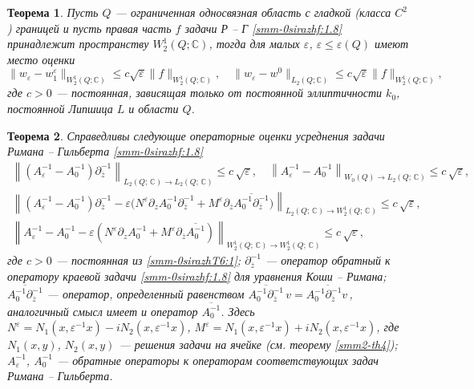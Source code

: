 \documentclass[a4paper,12pt]{article}
\newtheorem{theorem}{Теорема}[section]
\theoremstyle{definition}
\begin{document}
\begin{theorem}
{ Пусть $Q$ --- ограниченная односвязная область с гладкой (класса $C^2$) границей и пусть правая часть $f$ задачи Р -- Г \eqref{smm-0sirazhf:1.8} принадлежит пространству $W_2^1(Q;\mathbb{C})$, тогда для малых $\varepsilon$, $\varepsilon\leqslant \varepsilon(Q)$ имеют место оценки
	\begin{equation}\label{smm-0sirazhT6:1}
		\|w_\varepsilon-w_1^\varepsilon\|_{W_2^1 (Q; \mathbb{C})}\leqslant c\sqrt{\varepsilon}\|f
		\|_{W^1_2 (Q; \mathbb{C})}, \quad \|w_\varepsilon-w^0\|_{L_2 (Q; \mathbb{C})}\leqslant c\sqrt{\varepsilon}\|f
		\|_{W_2^1 (Q; \mathbb{C})},
	\end{equation}
	где $c>0$ --- постоянная, зависящая только от постоянной эллиптичности $k_0$,  постоянной Липшица $L$ и области $Q$.}
\end{theorem}




\begin{theorem}
{ Справедливы следующие операторные оценки усреднения задачи Римана -- Гильберта \eqref{smm-0sirazhf:1.8}
	\begin{gather}\label{smm-0sirazhOpop1}
		\left\|\left(A_\varepsilon^{-1}-A_0^{-1}\right)\partial_{\overline z}^{-1}\right\|_{L_2(Q;\,\mathbb{C})\to L_2(Q;\,\mathbb{C})}
		\leq c\,\sqrt\varepsilon,\quad
		\left\|A_\varepsilon^{-1}-A_0^{-1}\right\|_{W_0(Q)\to L_2(Q;\,\mathbb{C})}
		\leq c\,\sqrt\varepsilon,\\\label{smm-0sirazhOpop2}
		\left\|\left(A_\varepsilon^{-1}-A_0^{-1}\right)\partial_{\overline z}^{-1}-\varepsilon\Big(N^\varepsilon
		\partial_zA_0^{-1}
		\partial_{\overline z}^{-1}\right.
		+\left.M^\varepsilon\partial_{\overline z}\overline{A_0^{-1}\partial_{\overline z}^{-1}}\Big)
		\right\|_{L_2(Q;\,\mathbb{C})\to W^1_2(Q;\,\mathbb{C})}
		\leq c\,\sqrt\varepsilon,\\\label{smm-0sirazhOpop3}
		\left\|A_\varepsilon^{-1}-A_0^{-1}-\varepsilon\left(N^\varepsilon\partial_zA_0^{-1}
		+M^\varepsilon\partial_{\overline z}\overline{A_0^{-1}}\right)
		\right\|_{W^1_2(Q;\,\mathbb{C})\to W^1_2(Q;\,\mathbb{C})}
		\leq c\,\sqrt\varepsilon,
	\end{gather}
	где $c>0$ --- постоянная из \eqref{smm-0sirazhT6:1}; $\partial_{\overline z}^{-1}$ --- оператор обратный к
	оператору краевой задачи
	\eqref{smm-0sirazhf:1.8} для уравнения Коши -- Римана;
	$\overline{A_0^{-1}\partial_{\overline z}^{-1}}$ --- оператор,
	определенный равенством $\overline{A_0^{-1}\partial_{\overline z}^{-1}}{\,v}=\overline{A_0^{-1}\partial_{\overline z}^{-1}{v\,}}$,
	аналогичный смысл имеет и оператор $\overline{A_0^{-1}}$. Здесь
	$N^\varepsilon=N_1(x,\varepsilon^{-1}x)-iN_2(x,\varepsilon^{-1}x)$, $M^\varepsilon=N_1(x,\varepsilon^{-1}x)+iN_2(x,\varepsilon^{-1}x)$,  где $N_1(x,y)$, $N_2(x,y)$ --- решения задачи
	на ячейке (см. теорему \ref{smm2-th4}); $A_\varepsilon^{-1}$, $A_0^{-1}$
	--- обратные операторы к операторам соответствующих  задач Римана -- Гильберта}.
\end{theorem}
\end{document}
